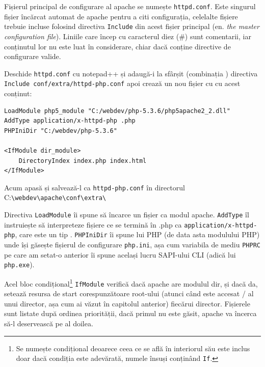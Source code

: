 Fișierul principal de configurare  al apache se numește \texttt{httpd.conf}. Este singurul
fișier încărcat automat de apache pentru a citi configurația, celelalte fișiere
trebuie incluse folosind directiva \texttt{Include} din acest fișier
principal (en. \textsl{the master configuration file}). Liniile care încep
cu caracterul diez (\#) sunt comentarii, iar conținutul lor nu este luat
în considerare, chiar dacă conține directive de configurare valide.

Deschide \texttt{httpd.conf} cu notepad++ și adaugă-i la sfârșit
(combinația ) directiva
\texttt{Include conf/extra/httpd-php.conf}
apoi crează un nou fișier cu  cu acest conținut:
\begin{verbatim}
LoadModule php5_module "C:/webdev/php-5.3.6/php5apache2_2.dll"
AddType application/x-httpd-php .php
PHPIniDir "C:/webdev/php-5.3.6"

<IfModule dir_module>
    DirectoryIndex index.php index.html
</IfModule>
\end{verbatim}

Acum apasă  și salvează-l ca \texttt{httpd-php.conf}
în directorul
C:\texttt{{\textbackslash}webdev{\textbackslash}apache{\textbackslash}conf{\textbackslash}extra{\textbackslash}}

Directiva \texttt{LoadModule} îi spune să încarce un fișier ca modul apache. \texttt{AddType}
îl instruiește să interpreteze fișiere ce se termină în .php ca 
\texttt{application/x-httpd-php}, care este un tip 
.
\texttt{PHPIniDir} îi spune lui PHP (de data asta modulului PHP) unde își găsește fișierul
de configurare \texttt{php.ini}, așa cum variabila de mediu \texttt{PHPRC} pe care
am setat-o anterior îi spune același lucru SAPI-ului CLI (adică lui \texttt{php.exe}).

Acel bloc condițional\footnote{Se numește condițional deoarece ceea ce se află
în interiorul său este inclus doar dacă condiția este adevărată, numele însuși
conținând \texttt{If}.}
 \texttt{IfModule} verifică dacă apache are modulul {\glqq}dir{\grqq}, și dacă
da, setează resursa de start corespunzătoare root-ului (atunci când este accesat {\glqq}/{\grqq}
al unui director, așa cum ai văzut în capitolul anterior) fiecărui director. Fișierele
sunt listate după ordinea priorității, dacă primul nu este găsit, apache va încerca să-l
deservească pe al doilea.

